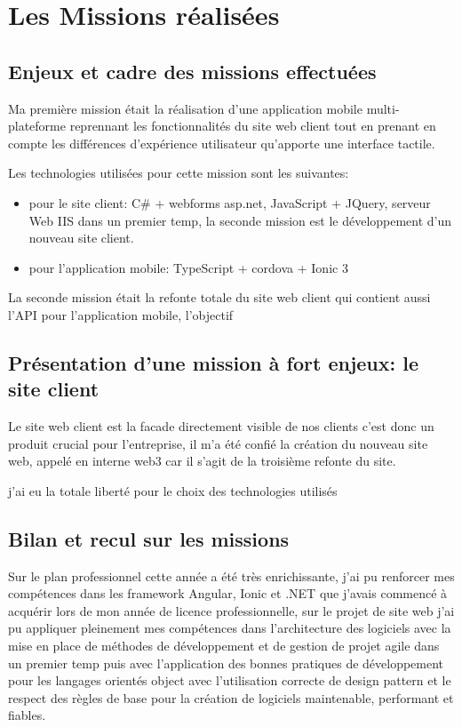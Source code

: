 \chapter{Les Missions réalisées}
\section{Enjeux et cadre des missions effectuées}
Ma première mission était la réalisation d'une application mobile multi-plateforme 
reprennant les fonctionnalités du site web client tout en prenant en compte 
les différences d'expérience utilisateur qu'apporte une interface tactile.\newline

Les technologies utilisées pour cette mission sont les suivantes:
\begin{itemize}
    \item pour le site client: C\# + webforms asp.net, JavaScript + JQuery, serveur Web IIS 
    dans un premier temp, la seconde mission est le développement d'un nouveau site client.
	\item pour l'application mobile: TypeScript + cordova + Ionic 3 \newline
\end{itemize} 

La seconde mission était la refonte totale du site web client qui contient aussi l'API pour 
l'application mobile, l'objectif 

\section{Présentation d'une mission à fort enjeux: le site client}
Le site web client est la facade directement visible de nos clients c'est donc un produit crucial pour
l'entreprise, il m'a été confié la création du nouveau site web, appelé en interne web3 car il s'agit de la troisième
refonte du site.

j'ai eu la totale liberté pour le choix des technologies utilisés 


\newpage
\section{Bilan et recul sur les missions}

Sur le plan professionnel cette année a été très enrichissante, j'ai pu renforcer mes compétences dans 
les framework Angular, Ionic et .NET que j'avais commencé à acquérir lors de mon année de licence 
professionnelle, sur le projet de site web j'ai pu appliquer pleinement mes compétences 
dans l'architecture des logiciels avec la mise en place de méthodes de développement et 
de gestion de projet agile dans un premier temp puis avec l'application des bonnes pratiques 
de développement pour les langages orientés object avec l'utilisation correcte de design pattern
et le respect des règles de base pour la création de logiciels maintenable, performant et fiables.
\newline

